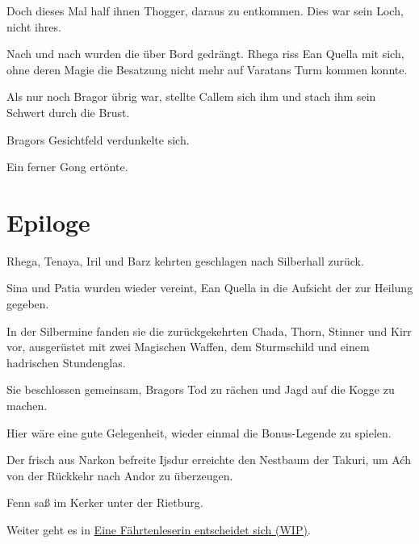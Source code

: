 Doch dieses Mal half ihnen Thogger, daraus zu entkommen. Dies war sein Loch, nicht ihres.

Nach und nach wurden die  über Bord gedrängt. Rhega riss Ean Quella mit sich, ohne deren Magie die Besatzung nicht mehr auf Varatans Turm kommen konnte.

Als nur noch Bragor übrig war, stellte Callem sich ihm und stach ihm sein Schwert durch die Brust.

Bragors Gesichtfeld verdunkelte sich.

Ein ferner Gong ertönte.








\newpage
\section{Epiloge}

Rhega, Tenaya, Iril und Barz kehrten geschlagen nach Silberhall zurück. 

Sina und Patia wurden wieder vereint, Ean Quella in die Aufsicht der  zur Heilung gegeben.

In der Silbermine fanden sie die zurückgekehrten Chada, Thorn, Stinner und Kirr vor, ausgerüstet mit zwei Magischen Waffen, dem Sturmschild und einem hadrischen Stundenglas. 

Sie beschlossen gemeinsam, Bragors Tod zu rächen und Jagd auf die Kogge zu machen.

\begin{commentbox}
    Hier wäre eine gute Gelegenheit, wieder einmal die Bonus-Legende  zu spielen.
\end{commentbox}

\trennzeichen

Der frisch aus Narkon befreite Ijsdur erreichte den Nestbaum der Takuri, um Aćh von der Rückkehr nach Andor zu überzeugen.

\trennzeichen

Fenn saß im Kerker unter der Rietburg.

\begin{commentbox}
    Weiter geht es in \hyperref[wip-eine-faehrtenleserin-entscheidet-sich]{Eine Fährtenleserin entscheidet sich (WIP)}.
\end{commentbox}

